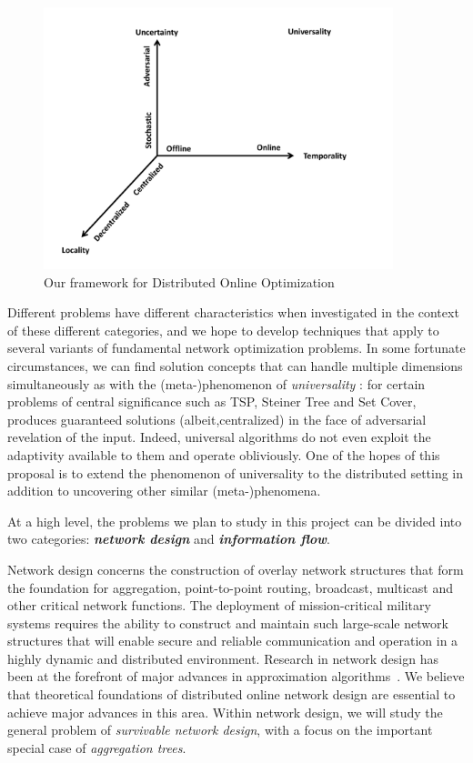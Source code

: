 \begin{figure}
\centering
\includegraphics[width=4in]{dimensions-rev.pdf}
\caption{Our framework for Distributed Online Optimization}
\label{fig:dimensions}
\end{figure}

Different problems have different characteristics when investigated in
the context of these different categories, and we hope to develop
techniques that apply to several variants of fundamental network
optimization problems.  In some fortunate circumstances, we can find
solution concepts that can handle multiple dimensions simultaneously
as with the (meta-)phenomenon of {\em universality}
\cite{jia+lnrs:universal}: for certain problems of central
significance such as TSP, Steiner Tree and Set Cover, produces
guaranteed solutions (albeit,centralized) in the face of adversarial
revelation of the input.  Indeed, universal algorithms do not even
exploit the adaptivity available to them and operate obliviously.  One
of the hopes of this proposal is to extend the phenomenon of
universality to the distributed setting in addition to uncovering
other similar (meta-)phenomena.

At a high level, the problems we plan to study in this project can be
divided into two categories: {\bf \em network design}\/ and {\bf \em
information flow}.
\medskip

 Network design concerns the construction of
overlay network structures that form the foundation for aggregation,
point-to-point routing, broadcast, multicast and other critical
network functions.  The deployment of mission-critical military
systems requires the ability to construct and maintain such
large-scale network structures that will enable secure and reliable
communication and operation in a highly dynamic and distributed
environment.  Research in network design has been at the forefront of
major advances in approximation algorithms~\cite{SWbook}.  We believe that
theoretical foundations of distributed online network design are
essential to achieve major advances in this area.  Within network
design, we will study the general problem of {\em survivable network
design}, with a focus on the important special case of {\em
aggregation trees}.

